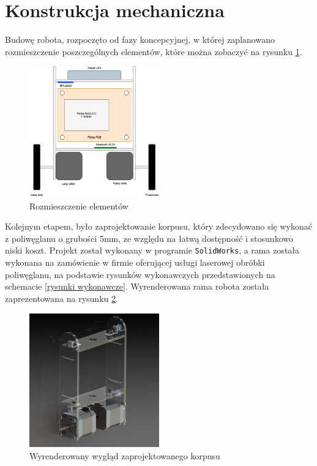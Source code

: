 \section{Konstrukcja mechaniczna}

Budowę robota, rozpoczęto od fazy koncepcyjnej, w której zaplanowano rozmieszczenie poszczególnych elementów, które można zobaczyć na rysunku \ref{Faza koncepcyjna}.

\begin{figure}[h!]
    \centering
    \includegraphics[width=0.5\textwidth]{Rysunki/Rozdzial05/Faza_koncepcyjna.png}
    \caption{Rozmieszczenie elementów}
    \label{Faza koncepcyjna}
\end{figure}

Kolejnym etapem, było zaprojektowanie korpusu, który zdecydowano się wykonać z poliwęglanu o grubości 5mm, ze względu na łatwą dostępność i stosunkowo niski koszt. Projekt został wykonany w programie \texttt{SolidWorks}, a rama została wykonana na zamówienie w firmie oferującej usługi laserowej obróbki poliwęglanu, na podstawie rysunków wykonawczych przedstawionych na schemacie \ref{rysunki wykonawcze}. Wyrenderowana rama robota została zaprezentowana na rysunku \ref{render}.

\begin{figure}[h!]
    \centering
    \includegraphics[width=0.5\textwidth]{Rysunki/Rozdzial05/rama.png}
    \caption{Wyrenderowany wygląd zaprojektowanego korpusu}
    \label{render}
\end{figure}

